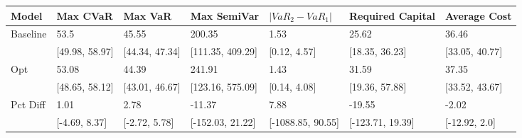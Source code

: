 \begin{tabular}{lllllll}
\toprule
   Model &       Max CVaR &        Max VaR &      Max SemiVar & $|VaR_2 - VaR_1|$ & Required Capital &   Average Cost \\
\midrule
Baseline &           53.5 &          45.55 &           200.35 &              1.53 &            25.62 &          36.46 \\
         & [49.98, 58.97] & [44.34, 47.34] & [111.35, 409.29] &      [0.12, 4.57] &   [18.35, 36.23] & [33.05, 40.77] \\
     Opt &          53.08 &          44.39 &           241.91 &              1.43 &            31.59 &          37.35 \\
         & [48.65, 58.12] & [43.01, 46.67] & [123.16, 575.09] &      [0.14, 4.08] &   [19.36, 57.88] & [33.52, 43.67] \\
Pct Diff &           1.01 &           2.78 &           -11.37 &              7.88 &           -19.55 &          -2.02 \\
         &  [-4.69, 8.37] &  [-2.72, 5.78] & [-152.03, 21.22] & [-1088.85, 90.55] & [-123.71, 19.39] &  [-12.92, 2.0] \\
\bottomrule
\end{tabular}
